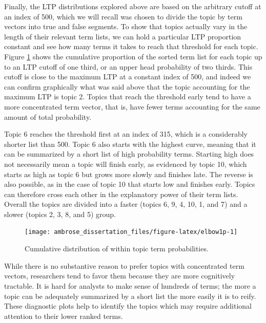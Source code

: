 \documentclass[]{book}
\theoremstyle{definition}
\theoremstyle{definition}
\theoremstyle{definition}
\theoremstyle{remark}
\begin{document}
Finally, the LTP distributions explored above are based on the arbitrary
cutoff at an index of 500, which we will recall was chosen to divide the
topic by term vectors into true and false segments. To show that topics
actually vary in the length of their relevant term lists, we can hold a
particular LTP proportion constant and see how many terms it takes to
reach that threshold for each topic. Figure \ref{fig:elbow1p} shows the
cumulative proportion of the sorted term list for each topic up to an
LTP cutoff of one third, or an upper head probability of two thirds.
This cutoff is close to the maximum LTP at a constant index of 500, and
indeed we can confirm graphically what was said above that the topic
accounting for the maximum LTP is topic 2. Topics that reach the
threshold early tend to have a more concentrated term vector, that is,
have fewer terms accounting for the same amount of total probability.

Topic 6 reaches the threshold first at an index of 315, which is a
considerably shorter list than 500. Topic 6 also starts with the highest
curve, meaning that it can be summarized by a short list of high
probability terms. Starting high does not necessarily mean a topic will
finish early, as evidenced by topic 10, which starts as high as topic 6
but grows more slowly and finishes late. The reverse is also possible,
as in the case of topic 10 that starts low and finishes early. Topics
can therefore cross each other in the explanatory power of their term
lists. Overall the topics are divided into a faster (topics 6, 9, 4, 10,
1, and 7) and a slower (topics 2, 3, 8, and 5) group.

\begin{figure}

{\centering \texttt{[image: ambrose\_dissertation\_files/figure-latex/elbow1p-1]} 

}

\caption{Cumulative distribution of within topic term probabilities.}\label{fig:elbow1p}
\end{figure}

While there is no substantive reason to prefer topics with concentrated
term vectors, researchers tend to favor them because they are more
cognitively tractable. It is hard for analysts to make sense of hundreds
of terms; the more a topic can be adequately summarized by a short list
the more easily it is to reify. These diagnostic plots help to identify
the topics which may require additional attention to their lower ranked
terms.
\end{document}
